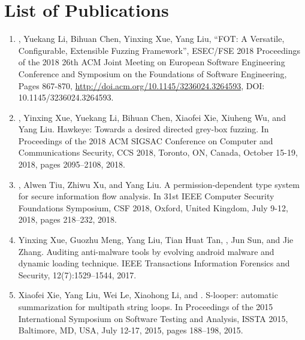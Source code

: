 \chapter{List of Publications} \label{app:paper}

\begin{enumerate}
\item \myname, Yuekang Li, Bihuan Chen, Yinxing Xue, Yang Liu, ``FOT: A Versatile, Configurable, Extensible Fuzzing Framework'', ESEC/FSE 2018 Proceedings of the 2018 26th ACM Joint Meeting on European Software Engineering Conference and Symposium on the Foundations of Software Engineering, Pages 867-870, \url{http://doi.acm.org/10.1145/3236024.3264593}, DOI: 10.1145/3236024.3264593.
\item \myname, Yinxing Xue, Yuekang Li, Bihuan Chen, Xiaofei Xie, Xiuheng Wu, and Yang Liu. Hawkeye: Towards a desired directed grey-box fuzzing. In Proceedings of the 2018 ACM SIGSAC Conference on Computer and Communications Security, CCS 2018, Toronto, ON, Canada, October 15-19, 2018, pages 2095–2108, 2018.
\item \myname, Alwen Tiu, Zhiwu Xu, and Yang Liu. A permission-dependent type system for secure information flow analysis. In 31st IEEE Computer Security Foundations Symposium, CSF 2018, Oxford, United Kingdom, July 9-12, 2018, pages 218–232, 2018.
\item Yinxing Xue, Guozhu Meng, Yang Liu, Tian Huat Tan, \myname, Jun Sun, and Jie Zhang. Auditing anti-malware tools by evolving android malware and dynamic loading technique. IEEE Transactions Information Forensics and Security, 12(7):1529–1544, 2017.
\item Xiaofei Xie, Yang Liu, Wei Le, Xiaohong Li, and \myname. S-looper: automatic summarization for multipath string loops. In Proceedings of the 2015 International Symposium on Software Testing and Analysis, ISSTA 2015, Baltimore, MD, USA, July 12-17, 2015, pages 188–198, 2015.
\end{enumerate}
